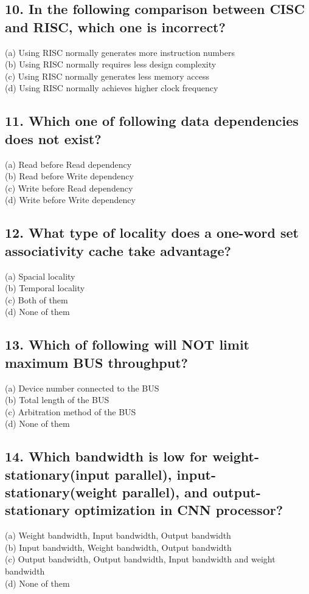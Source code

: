 \documentclass[UTF8]{ctexart}
\begin{document}
\subsection*{10. In the following comparison between CISC and RISC, which one is incorrect?}
(a) Using RISC normally generates more instruction numbers\\
(b) Using RISC normally requires less design complexity\\
(c) Using RISC normally generates less memory access\\
(d) Using RISC normally achieves higher clock frequency\\
\subsection*{11. Which one of following data dependencies does not exist?}
(a) Read before Read dependency\\
(b) Read before Write dependency\\
(c) Write before Read dependency\\
(d) Write before Write dependency\\
\subsection*{12. What type of locality does a one-word set associativity cache take advantage?}
(a) Spacial locality\\
(b) Temporal locality\\
(c) Both of them\\
(d) None of them\\
\subsection*{13. Which of following will NOT limit maximum BUS throughput?}
(a) Device number connected to the BUS\\
(b) Total length of the BUS\\
(c) Arbitration method of the BUS\\
(d) None of them\\
\subsection*{14. Which bandwidth is low for weight-stationary(input parallel), input-stationary(weight parallel), and output-stationary optimization in CNN processor?}
(a) Weight bandwidth, Input bandwidth, Output bandwidth\\
(b) Input bandwidth, Weight bandwidth, Output bandwidth\\
(c) Output bandwidth, Output bandwidth, Input bandwidth and weight bandwidth\\
(d) None of them\\
\end{document}
